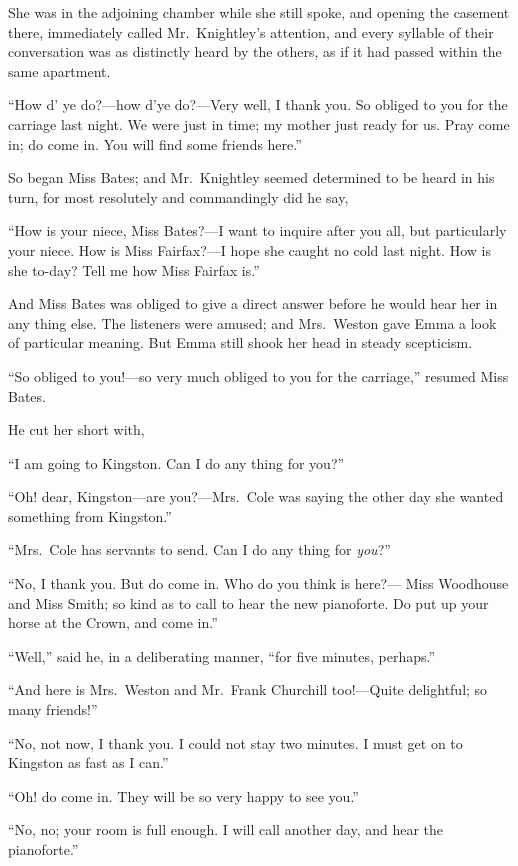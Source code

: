 She was in the adjoining chamber while she still spoke, and opening
the casement there, immediately called Mr.\ Knightley's attention,
and every syllable of their conversation was as distinctly heard
by the others, as if it had passed within the same apartment.

``How d' ye do?---how d'ye do?---Very well, I thank you.  So obliged
to you for the carriage last night.  We were just in time;
my mother just ready for us.  Pray come in; do come in.  You will
find some friends here.''

So began Miss Bates; and Mr.\ Knightley seemed determined to be heard
in his turn, for most resolutely and commandingly did he say,

``How is your niece, Miss Bates?---I want to inquire after you all,
but particularly your niece.  How is Miss Fairfax?---I hope she
caught no cold last night.  How is she to-day? Tell me how Miss
Fairfax is.''

And Miss Bates was obliged to give a direct answer before he
would hear her in any thing else.  The listeners were amused;
and Mrs.\ Weston gave Emma a look of particular meaning.  But Emma
still shook her head in steady scepticism.

``So obliged to you!---so very much obliged to you for the carriage,''
resumed Miss Bates.

He cut her short with,

``I am going to Kingston.  Can I do any thing for you?''

``Oh! dear, Kingston---are you?---Mrs.\ Cole was saying the other day
she wanted something from Kingston.''

``Mrs.\ Cole has servants to send.  Can I do any thing for \emph{you}?''

``No, I thank you.  But do come in.  Who do you think is here?---%
Miss Woodhouse and Miss Smith; so kind as to call to hear the
new pianoforte.  Do put up your horse at the Crown, and come in.''

``Well,'' said he, in a deliberating manner, ``for five minutes, perhaps.''

``And here is Mrs.\ Weston and Mr.\ Frank Churchill too!---Quite delightful;
so many friends!''

``No, not now, I thank you.  I could not stay two minutes.
I must get on to Kingston as fast as I can.''

``Oh! do come in.  They will be so very happy to see you.''

``No, no; your room is full enough.  I will call another day,
and hear the pianoforte.''

